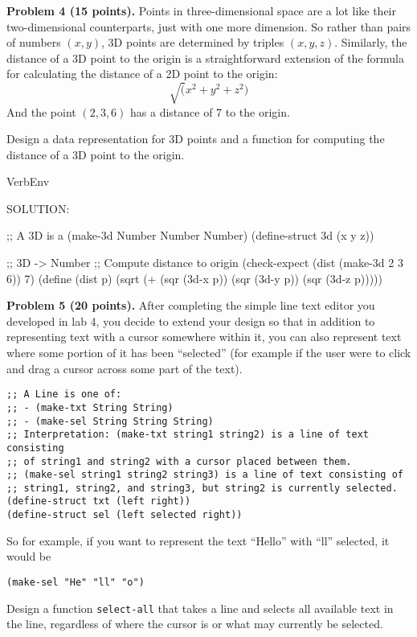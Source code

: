 \documentclass[12pt]{article}
\begin{document}


\newpage
\noindent
{\bf Problem 4 (15 points).}
%
Points in three-dimensional space are a lot like their two-dimensional
counterparts, just with one more dimension.  So rather than pairs of
numbers $(x,y)$, 3D points are determined by triples $(x,y,z)$.
%
Similarly, the distance of a 3D point to the origin is a
straightforward extension of the formula for calculating the distance
of a 2D point to the origin:
\[
\sqrt (x^2 + y^2 + z^2)
\]
And the point $(2,3,6)$ has a distance of 7 to the origin.

Design a data representation for 3D points and a function for
computing the distance of a 3D point to the origin.

\begin{SaveVerbatim}{VerbEnv}

SOLUTION:
  
;; A 3D is a (make-3d Number Number Number)
(define-struct 3d (x y z))

;; 3D -> Number
;; Compute distance to origin
(check-expect (dist (make-3d 2 3 6)) 7)
(define (dist p)
  (sqrt (+ (sqr (3d-x p)) (sqr (3d-y p)) (sqr (3d-z p)))))
\end{SaveVerbatim}




\newpage
\noindent
{\bf Problem 5 (20 points).} 
%
After completing the simple line text editor you developed in lab 4,
you decide to extend your design so that in addition to representing
text with a cursor somewhere within it, you can also represent text
where some portion of it has been ``selected'' (for example if the
user were to click and drag a cursor across some part of the text).

\begin{verbatim}
;; A Line is one of:
;; - (make-txt String String)
;; - (make-sel String String String)
;; Interpretation: (make-txt string1 string2) is a line of text consisting
;; of string1 and string2 with a cursor placed between them.
;; (make-sel string1 string2 string3) is a line of text consisting of
;; string1, string2, and string3, but string2 is currently selected.
(define-struct txt (left right))
(define-struct sel (left selected right))
\end{verbatim}
So for example, if you want to represent the text ``Hello'' with
``ll'' selected, it would be 
\begin{verbatim}
(make-sel "He" "ll" "o")
\end{verbatim}
Design a function \verb|select-all| that takes a line and selects all
available text in the line, regardless of where the cursor is or what
may currently be selected.
\end{document}
